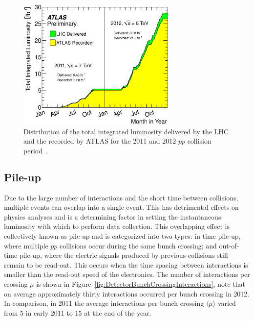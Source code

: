 \begin{figure}[htbp]
  \centering
    \includegraphics[width=0.70\textwidth]{PartDetector/Plots/IntegratedLuminosity20112012.eps}
    \caption[Distribution of the total integrated luminosity delivered by the LHC and the recorded by ATLAS for the 2011 and 2012 $pp$ collision period.]{Distribution of the total integrated luminosity delivered by the LHC and the recorded by ATLAS for the 2011 and 2012 $pp$ collision period~\cite{Detector:LuminosityResults,Luminosity}.} \label{fig:DetectorIntLumi}
\end{figure}

\subsection{Pile-up}

Due to the large number of interactions and the short time between collisions, multiple events can overlap into a single event. This has detrimental effects on physics analyses and is a determining factor in setting the instantaneous luminosity with which to perform data collection. This overlapping effect is collectively known as pile-up and is categorized into two types: in-time pile-up, where multiple $pp$ collisions occur during the same bunch crossing; and out-of-time pile-up, where the electric signals produced by previous collisions still remain to be read-out. This occurs when the time spacing between interactions is smaller than the read-out speed of the electronics. The number of interactions per crossing $\mu$ is shown in Figure~\ref{fig:DetectorBunchCrossingInteractions}, note that on average approximately thirty interactions occurred per bunch crossing in 2012. In comparison, in 2011 the average interactions per bunch crossing $\langle\mu\rangle$ varied from 5 in early 2011 to 15 at the end of the year.

